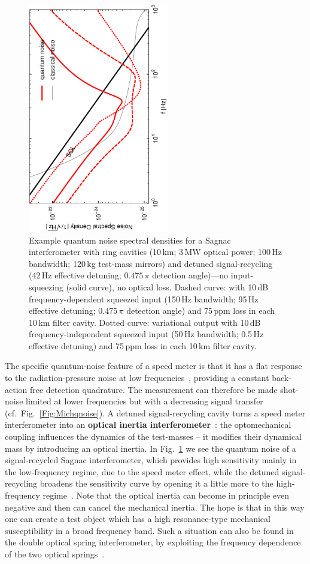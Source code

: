 \begin{figure}[h]
\centerline{\includegraphics[height=10cm,angle=-90]{./Sec_Optics/EToptSagN.pdf}}
\caption{Example quantum noise spectral densities for a Sagnac
interferometer with ring cavities (10\,km; 3\,MW optical power;
100\,Hz bandwidth; 120\,kg test-mass mirrors) and detuned
signal-recycling (42\,Hz effective detuning; $0.475\,\pi$
detection angle)---no input-squeezing (solid curve), no optical
loss. Dashed curve: with 10\,dB frequency-dependent squeezed input
(150\,Hz bandwidth; 95\,Hz effective detuning; $0.475\,\pi$
detection angle) and 75\,ppm loss in each 10\,km filter cavity.
Dotted curve: variational output with 10\,dB frequency-independent
squeezed input (50\,Hz bandwidth; 0.5\,Hz effective detuning) and
75\,ppm loss in each 10\,km filter cavity.}
\label{Fig:Sagoptqnoise}
\end{figure}
%
The specific quantum-noise feature of a speed meter is that it has
a flat response to the radiation-pressure noise at low
frequencies~\cite{Chen2003}, providing a constant back-action free
detection quadrature. The measurement can therefore be made
shot-noise limited at lower frequencies but with a decreasing
signal transfer~\cite{Sun1996} (cf.\ Fig.~\ref{Fig:Michqnoise}). A
detuned signal-recycling cavity turns a speed meter interferometer
into an {\bf optical inertia
interferometer}~\cite{Mueller-Ebhardt2009a}: the optomechanical
coupling influences the dynamics of the test-masses -- it modifies
their dynamical mass by introducing an optical inertia. In
Fig.~\ref{Fig:Sagoptqnoise} we see the quantum noise of a
signal-recycled Sagnac interferometer, which provides high
sensitivity mainly in the low-frequency regime, due to the speed
meter effect, while the detuned signal-recycling broadens the
sensitivity curve by opening it a little more to the
high-frequency regime~\cite{Mueller-Ebhardt2009}. Note that the
optical inertia can become in principle even negative and then can
cancel the mechanical inertia. The hope is that in this way one
can create a test object which has a high resonance-type
mechanical susceptibility in a broad frequency band. Such a
situation can also be found in the double optical spring
interferometer, by exploiting the frequency dependence of the two
optical springs~\cite{Khalilia}.

